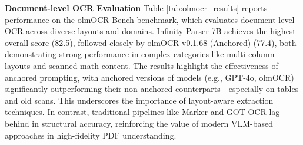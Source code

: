 


\textbf{Document-level OCR Evaluation} Table \ref{tab:olmocr_results} reports performance on the olmOCR-Bench benchmark, which evaluates document-level OCR across diverse layouts and domains. Infinity-Parser-7B achieves the highest overall score (82.5), followed closely by olmOCR v0.1.68 (Anchored) (77.4), both demonstrating strong performance in complex categories like multi-column layouts and scanned math content. The results highlight the effectiveness of anchored prompting, with anchored versions of models (e.g., GPT-4o, olmOCR) significantly outperforming their non-anchored counterparts—especially on tables and old scans. This underscores the importance of layout-aware extraction techniques. In contrast, traditional pipelines like Marker and GOT OCR lag behind in structural accuracy, reinforcing the value of modern VLM-based approaches in high-fidelity PDF understanding.


